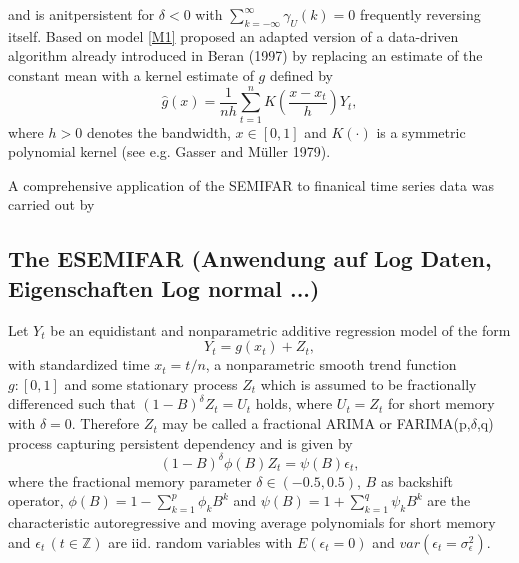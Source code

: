 \documentclass[12pt]{article}
\begin{document}
and is anitpersistent for \(\delta < 0\) with \( \sum_{k=-\infty}^{\infty} \gamma_{U}(k) = 0  \) frequently reversing itself. Based on model \eqref{M1} \citet{beran2002semifar} proposed an adapted version of  a data-driven algorithm already introduced in Beran (1997) by replacing an estimate of the constant mean with a kernel estimate of $g$ defined by
\begin{equation}
	\hat{g}(x) = \frac{1}{nh}\sum_{t=1}^{n}K(\frac{x-x_t}{h})Y_t,
\end{equation}
where $h>0$ denotes the bandwidth, $x\in[0,1]$ and $K(\cdot)$ is a symmetric polynomial kernel (see e.g. Gasser and M\"uller 1979). 

A comprehensive application of the SEMIFAR to finanical time series data was carried out by 
\subsection{The ESEMIFAR (Anwendung auf Log Daten, Eigenschaften Log normal ...)}
Let \(Y_{t}\) be an equidistant and nonparametric additive regression model of the form
\begin{equation}
\label{eq:Start}
Y_{t} = g(x_{t}) + Z_{t},
\end{equation} 
with standardized time \(x_t = t/n\), a nonparametric smooth trend function \(g:[0,1]\) and some stationary process \(Z_t\) which is assumed to be fractionally differenced such that \((1-B)^{\delta}Z_t =U_t\) holds, where \(U_t = Z_t\) for short memory with \(\delta = 0\).
Therefore \(Z_t\) may be called a  fractional ARIMA or FARIMA(p,\(\delta\),q) process capturing persistent dependency and is given by 
\begin{equation}
\label{eq:FARIMA}
	(1-B)^{\delta}\phi(B) Z_{t} = \psi(B) \epsilon_{t}, 
\end{equation}
where the fractional memory parameter \( \delta \in (-0.5,0.5) \),
 \(B\) as backshift operator, \( \phi(B) = 1 - \sum_{k=1}^{p} \phi_{k} B^k \) and \( \psi(B) = 1 + \sum_{k=1}^{q} \psi_{k} B^k \) are the characteristic autoregressive and moving average polynomials for short memory and \( \epsilon_{t} \, (t \in \mathbb{Z}) \)  are iid. random variables with \(E(\epsilon_{t} = 0)\) and \(var(\epsilon_{t} = \sigma_{\epsilon}^{2})\).
 
\end{document}
